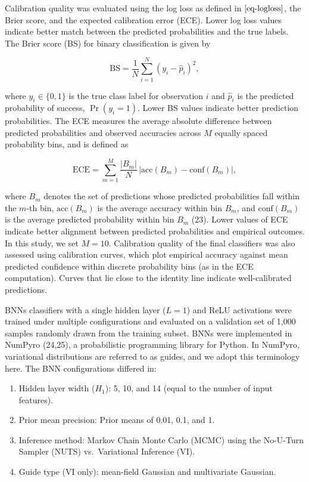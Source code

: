 \documentclass[
  a4paper,
]{scrreprt}
\providecommand{\tightlist}{%
  \setlength{\itemsep}{0pt}\setlength{\parskip}{0pt}}
\begin{document}
Calibration quality was evaluated using the log loss as defined in
\(\ref{eq-logloss}\), the Brier score, and the expected calibration
error (ECE). Lower log loss values indicate better match between the
predicted probabilities and the true labels. The Brier score (BS) for
binary classification is given by

\[
\text{BS}=\frac{1}{N}\sum_{i=1}^{N}{(y_i-\hat{p}_i)^2},
\]

where \(y_i \in \{0,1\}\) is the true class label for observation \(i\)
and \(\hat{p}_i\) is the predicted probability of success,
\(\Pr(y_i=1)\). Lower BS values indicate better prediction
probabilities. The ECE measures the average absolute difference between
predicted probabilities and observed accuracies across \(M\) equally
spaced probability bins, and is defined as

\[
\text{ECE} = \sum_{m=1}^M \frac{|B_m|}{N} \, \big| \text{acc}(B_m) - \text{conf}(B_m) \big|,
\]

where \(B_m\) denotes the set of predictions whose predicted
probabilities fall within the \(m\)-th bin, \(\text{acc}(B_m)\) is the
average accuracy within bin \(B_m\), and \(\text{conf}(B_m)\) is the
average predicted probability within bin \(B_m\) (23). Lower values of
ECE indicate better alignment between predicted probabilities and
empirical outcomes. In this study, we set \(M=10\). Calibration quality
of the final classifiers was also assessed using calibration curves,
which plot empirical accuracy against mean predicted confidence within
discrete probability bins (as in the ECE computation). Curves that lie
close to the identity line indicate well-calibrated predictions.

BNNs classifiers with a single hidden layer (\(L = 1\)) and ReLU
activations were trained under multiple configurations and evaluated on
a validation set of 1,000 samples randomly drawn from the training
subset. BNNs were implemented in NumPyro (24,25), a probabilistic
programming library for Python. In NumPyro, variational distributions
are referred to as guides, and we adopt this terminology here. The BNN
configurations differed in:

\begin{enumerate}
\def\labelenumi{\arabic{enumi}.}
\tightlist
\item
  Hidden layer width (\(H_1\)): 5, 10, and 14 (equal to the number of
  input features).
\item
  Prior mean precision: Prior means of 0.01, 0.1, and 1.
\item
  Inference method: Markov Chain Monte Carlo (MCMC) using the No-U-Turn
  Sampler (NUTS) vs.~Variational Inference (VI).
\item
  Guide type (VI only): mean-field Gaussian and multivariate Gaussian.
\end{enumerate}
\end{document}
